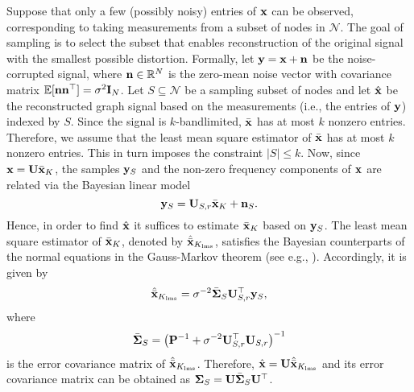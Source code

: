 Suppose that only a few (possibly noisy) entries of ${\mathbf x}$ can be observed, corresponding to 
taking measurements from a subset of nodes in $\mathcal{N}$. The goal of sampling is to
select the subset that enables reconstruction of the original signal with the smallest possible
distortion. Formally, let ${\mathbf y} = {\mathbf x} + {\mathbf n}$ be the noise-corrupted signal, where ${\mathbf n} \in {\mathbb{R}}^{N}$ is the zero-mean noise vector with covariance matrix $\operatorname{\mathbb{E}}[{\mathbf n}{\mathbf n}^\top]=\sigma^2 {\mathbf I}_N$. Let $S \subseteq \mathcal{N}$ be a sampling subset of nodes and let $\hat{{\mathbf x}}$ be the reconstructed graph signal based on the measurements (i.e., the entries of ${\mathbf y}$) indexed by $S$. Since the signal is $k$-bandlimited, $\bar{{\mathbf x}}$ has at most $k$ nonzero entries. Therefore, we assume that the least mean square estimator of $\bar{{\mathbf x}}$ has at most  $k$ nonzero entries. This in turn imposes the constraint $|S|\leq k$. Now, 
since ${\mathbf x} = {\mathbf U}\bar{{\mathbf x}}_K$, the samples ${\mathbf y}_S$ and the non-zero frequency components of ${\mathbf x}$ are related via the Bayesian linear model
%
\begin{equation}\label{eq:model}
{\mathbf y}_S = {\mathbf U}_{S,r}\bar{{\mathbf x}}_K +{\mathbf n}_{S}.
\end{equation}
%
Hence, in order to find $\hat{{\mathbf x}}$ it suffices to estimate $\bar{{\mathbf x}}_K$ based on ${\mathbf y}_S$.
The least mean square estimator of $\bar{{\mathbf x}}_K$, denoted by $\hat{\bar{{\mathbf x}}}_{K_{\mathrm{lms}}}$, satisfies the Bayesian counterparts of the normal equations in the Gauss-Markov theorem (see e.g.,  \cite[Ch. 10]{kay1993fundamentals}). Accordingly, it is given by
%
\begin{equation}\label{eq:estf}
\hat{\bar{{\mathbf x}}}_{K_{\mathrm{lms}}} = \sigma^{-2}\bar{{\mathbf \Sigma}}_S {\mathbf U}_{S,r}^\top {\mathbf y}_S,
\end{equation}
%
where 
%
\begin{equation}\label{eq:covf}
\bar{{\mathbf \Sigma}}_S = \left({\mathbf P}^{-1}+\sigma^{-2}{\mathbf U}_{S,r}^\top{\mathbf U}_{S,r}\right)^{-1}
\end{equation}
%
is the error covariance matrix of $\hat{\bar{{\mathbf x}}}_{K_{\mathrm{lms}}}$. Therefore, $\hat{{\mathbf x}} = {\mathbf U}\hat{\bar{{\mathbf x}}}_{K_{\mathrm{lms}}}$ and its error covariance matrix can be obtained as ${{\mathbf \Sigma}}_S = {\mathbf U} \bar{{\mathbf \Sigma}}_S {\mathbf U}^\top$.

